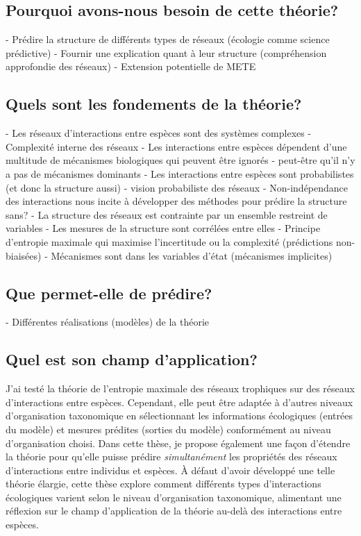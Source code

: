 \subsection{Pourquoi avons-nous besoin de cette théorie?} 

- Prédire la structure de différents types de réseaux (écologie comme science prédictive)
- Fournir une explication quant à leur structure (compréhension approfondie des réseaux)
- Extension potentielle de METE

\subsection{Quels sont les fondements de la théorie?} 

- Les réseaux d'interactions entre espèces sont des systèmes complexes
- Complexité interne des réseaux 
- Les interactions entre espèces dépendent d'une multitude de mécanismes biologiques qui peuvent être ignorés - peut-être qu'il n'y a pas de mécanismes dominants
- Les interactions entre espèces sont probabilistes (et donc la structure aussi) - vision probabiliste des réseaux
- Non-indépendance des interactions nous incite à développer des méthodes pour prédire la structure sans?
- La structure des réseaux est contrainte par un ensemble restreint de variables
- Les mesures de la structure sont corrélées entre elles
- Principe d'entropie maximale qui maximise l'incertitude ou la complexité (prédictions non-biaisées) 
- Mécanismes sont dans les variables d'état (mécanismes implicites)

\subsection{Que permet-elle de prédire?} 

- Différentes réalisations (modèles) de la théorie 

\subsection{Quel est son champ d'application?} 

J'ai testé la théorie de l'entropie maximale des réseaux trophiques sur des
réseaux d'interactions entre espèces. Cependant, elle peut être adaptée à
d'autres niveaux d'organisation taxonomique en sélectionnant les informations
écologiques (entrées du modèle) et mesures prédites (sorties du modèle)
conformément au niveau d'organisation choisi. Dans cette thèse, je propose
également une façon d'étendre la théorie pour qu'elle puisse prédire
\textit{simultanément} les propriétés des réseaux d'interactions entre individus
et espèces. À défaut d'avoir développé une telle théorie élargie, cette thèse
explore comment différents types d'interactions écologiques varient selon le
niveau d'organisation taxonomique, alimentant une réflexion sur le champ
d'application de la théorie au-delà des interactions entre espèces. 

